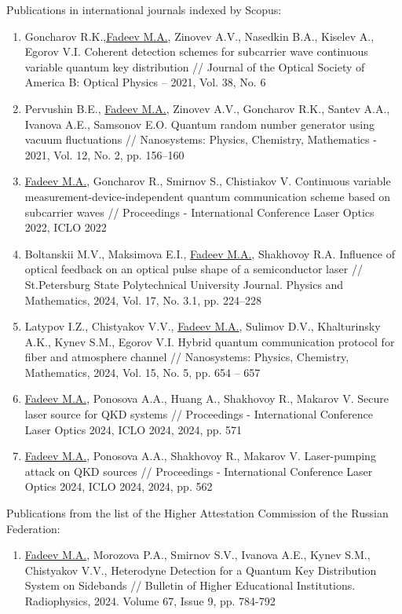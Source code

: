 Publications in international journals indexed by Scopus:\\
\begin{enumerate}
    \item Goncharov R.K.,\underline{Fadeev M.A.}, Zinovev A.V., Nasedkin B.A., Kiselev A., Egorov V.I. Coherent detection schemes for subcarrier wave continuous variable quantum key distribution // Journal of the Optical Society of America B: Optical Physics -- 2021, Vol. 38, No. 6
    \item Pervushin B.E., \underline{Fadeev M.A.}, Zinovev A.V., Goncharov R.K., Santev A.A., Ivanova A.E., Samsonov E.O. Quantum random number generator using vacuum fluctuations //  Nanosystems: Physics, Chemistry, Mathematics - 2021, Vol. 12, No. 2, pp. 156--160
    \item \underline{Fadeev M.A.}, Goncharov R., Smirnov S., Chistiakov V. Continuous variable measurement-device-independent quantum communication scheme based on subcarrier waves // Proceedings - International Conference Laser Optics 2022, ICLO 2022
    \item Boltanskii M.V., Maksimova E.I., \underline{Fadeev M.A.}, Shakhovoy R.A. Influence of optical feedback on an optical pulse shape of a semiconductor laser //  St.Petersburg State Polytechnical University Journal. Physics and Mathematics, 2024, Vol. 17, No. 3.1, pp. 224--228
    \item Latypov I.Z., Chistyakov V.V., \underline{Fadeev M.A.}, Sulimov D.V., Khalturinsky A.K., Kynev S.M., Egorov V.I. Hybrid quantum communication protocol for fiber and atmosphere channel //  Nanosystems: Physics, Chemistry, Mathematics, 2024, Vol. 15, No. 5, pp. 654 -- 657
    \item \underline{Fadeev M.A.}, Ponosova A.A., Huang A., Shakhovoy R., Makarov V. Secure laser source for QKD systems // Proceedings - International Conference Laser Optics 2024, ICLO 2024, 2024, pp. 571
    \item \underline{Fadeev M.A.}, Ponosova A.A., Shakhovoy R., Makarov V. Laser-pumping attack on QKD sources // Proceedings - International Conference Laser Optics 2024, ICLO 2024, 2024, pp. 562

\end{enumerate}

Publications from the list of the Higher Attestation Commission of the Russian Federation: \\
\begin{enumerate}
\item \underline{Fadeev M.A.}, Morozova P.A., Smirnov S.V., Ivanova A.E., Kynev S.M., Chistyakov V.V., Heterodyne Detection for a Quantum Key Distribution System on Sidebands // Bulletin of Higher Educational Institutions. Radiophysics, 2024. Volume 67, Issue 9, pp. 784-792
\end{enumerate}


